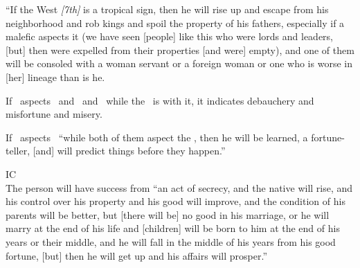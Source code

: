 ``If the West \textsl{[7th]} is a tropical sign, then he will rise up and escape from his neighborhood and rob kings and spoil the property of his fathers, especially if a malefic aspects it (we have seen [people] like this who were lords and leaders, [but] then were expelled from their properties [and were] empty), and one of them will be consoled with a woman servant or a foreign woman or one who is worse in [her] lineage than is he.

If \Jupiter\, aspects \Venus\, and \Mercury\, and \Mars\, while the \Moon\, is with it, it indicates debauchery and misfortune and misery.

If \Venus\, aspects \Jupiter\, ``while both of them aspect the \Moon, then he will be learned, a fortune-teller, [and] will predict things before they happen.''

\vspace{0.5em}
\noindent\textsc{IC} \hfill \\
\indent The person will have success from ``an act of secrecy, and the native will rise, and his control over his property and his good will improve, and the condition of his parents will be better, but [there will be] no good in his marriage, or he will marry at the end of his life and [children] will be born to him at the end of his years or their middle, and he will fall in the middle of his years from his good fortune, [but] then he will get up and his affairs will prosper.''
